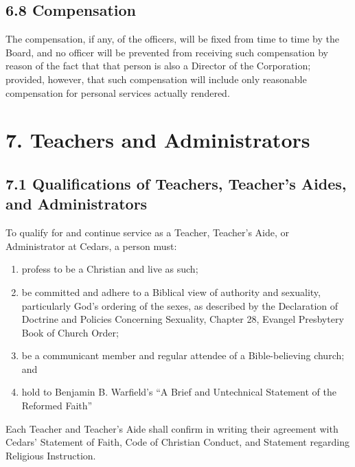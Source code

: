 \documentclass[
]{book}
\providecommand{\tightlist}{%
  \setlength{\itemsep}{0pt}\setlength{\parskip}{0pt}}
\begin{document}
\subsection*{6.8 Compensation}\label{compensation}

The compensation, if any, of the officers, will be fixed from time to time by the Board, and no officer will be prevented from receiving such compensation by reason of the fact that that person is also a Director of the Corporation; provided, however, that such compensation will include only reasonable compensation for personal services actually rendered.

\section*{7. Teachers and Administrators}\label{teachers-and-administrators}

\subsection*{7.1 Qualifications of Teachers, Teacher's Aides, and Administrators}\label{qualifications-of-teachers-teachers-aides-and-administrators}

To qualify for and continue service as a Teacher, Teacher's Aide, or Administrator at Cedars, a person must:

\begin{enumerate}
\def\labelenumi{\alph{enumi}.}
\tightlist
\item
  profess to be a Christian and live as such;
\item
  be committed and adhere to a Biblical view of authority and sexuality, particularly God's ordering of the sexes, as described by the Declaration of Doctrine and Policies Concerning Sexuality, Chapter 28, Evangel Presbytery Book of Church Order;
\item
  be a communicant member and regular attendee of a Bible-believing church; and
\item
  hold to Benjamin B. Warfield's ``A Brief and Untechnical Statement of the Reformed Faith''
\end{enumerate}

Each Teacher and Teacher's Aide shall confirm in writing their agreement with Cedars' Statement of Faith, Code of Christian Conduct, and Statement regarding Religious Instruction.
\end{document}
